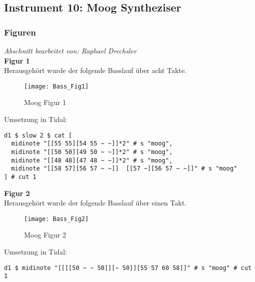 \documentclass[
10pt, %
a4paper, %
oneside, %
headinclude,footinclude, %
BCOR5mm, %
]{scrartcl}
\begin{document}
\subsection{Instrument 10: Moog Syntheziser}
\subsubsection{Figuren}
\textit{Abschnitt bearbeitet von: Raphael Drechsler}\\

\noindent\textbf{Figur 1}\\
Herausgehört wurde der folgende Basslauf über acht Takte.\\
\begin{figure}[h]
	\centering 
	\texttt{[image: Bass\_Fig1]} 
	\caption{Moog Figur 1}
\end{figure}

\noindent Umsetzung in Tidal:
\begin{lstlisting}
d1 $ slow 2 $ cat [
  midinote "[[55 55][54 55 ~ ~]]*2" # s "moog",
  midinote "[[50 50][49 50 ~ ~]]*2" # s "moog",
  midinote "[[48 48][47 48 ~ ~]]*2" # s "moog",
  midinote "[[58 57][56 57 ~ ~]]  [[57 ~][56 57 ~ ~]]" # s "moog" 
] # cut 1
\end{lstlisting}

\noindent\textbf{Figur 2}\\
Herausgehört wurde der folgende Basslauf über einen Takt.
\begin{figure}[h]
	\centering 
	\texttt{[image: Bass\_Fig2]} 
	\caption{Moog Figur 2}
\end{figure}

\noindent Umsetzung in Tidal:
\begin{lstlisting}
d1 $ midinote "[[[[50 ~ ~ 50]][~ 50]][55 57 60 58]]" # s "moog" # cut 1
\end{lstlisting}
\end{document}

